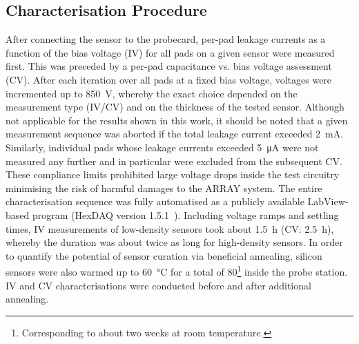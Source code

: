 \subsection{Characterisation Procedure}
\label{subsec:setup_procedure}
After connecting the sensor to the probecard, per-pad leakage currents as a function of the bias voltage (IV) for all pads on a given sensor were measured first.
This was preceded by a per-pad capacitance vs. bias voltage assessment (CV).
After each iteration over all pads at a fixed bias voltage, voltages were incremented up to \SI{850}{\volt}, whereby the exact choice depended on the measurement type (IV/CV) and on the thickness of the tested sensor.
Although not applicable for the results shown in this work, it should be noted that a given measurement sequence was aborted if the total leakage current exceeded \SI{2}{\milli\ampere}.
Similarly, individual pads whose leakage currents exceeded \SI{5}{\micro\ampere} were not measured any further and in particular were excluded from the subsequent CV.
These compliance limits prohibited large voltage drops inside the test circuitry minimising the risk of harmful damages to the ARRAY system.
The entire characterisation sequence was fully automatised as a publicly available LabView-based program (HexDAQ version 1.5.1~\cite{labview_hexdaq}).
Including voltage ramps and settling times, IV measurements of low-density sensors took about \SI{1.5}{\hour} (CV: \SI{2.5}{\hour}), whereby the duration was about twice as long for high-density sensors.
In order to quantify the potential of sensor curation via beneficial annealing, silicon sensors were also warmed up to \SI{60}{\celsius} for a total of \SI{80}{\min}\footnote{Corresponding to about two weeks at room temperature.} inside the probe station.
IV and CV characterisations were conducted before and after additional annealing.
